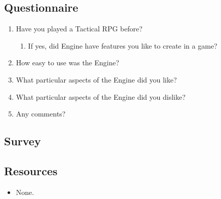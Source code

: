 \subsection{Questionnaire}
\begin{enumerate}
	\item Have you played a Tactical RPG before?
	\begin{enumerate}
		\item If yes, did Engine have features you like to create in a game?
	\end{enumerate}
	\item How easy to use was the Engine?
	\item What particular aspects of the Engine did you like? 
	\item What particular aspects of the Engine did you dislike? 
	\item Any comments?
\end{enumerate}

\clearpage
\subsection{Survey}

\clearpage

\subsection{Resources} 
\label{resources}
\begin{itemize}
	\item None.
\end{itemize}





